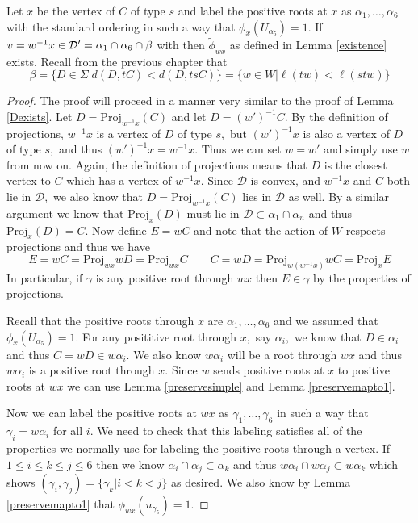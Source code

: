 \documentclass[class=book, crop=false]{standalone}
\begin{document}
\begin{lemma} 
	Let $x$ be the vertex of $C$ of type $s$ and label the positive roots at $x$ as $\alpha_1,\dots,\alpha_6$ with the standard ordering in such a way that $\phi_x(U_{\alpha_5})=1.$ If $v=w^{-1}x\in \mathcal{D}'=\alpha_1\cap \alpha_6\cap \beta$ with then $\tilde{\phi}_{wx}$ as defined in Lemma \ref{existence} exists. Recall from the previous chapter that 
	\[
	\beta=\{D\in \Sigma|d(D,tC)<d(D,tsC)\}=\{w\in W|\ell(tw)<\ell(stw)\}
\]
	\label{336f2Dexists}
\end{lemma}
\begin{proof}
	The proof will proceed in a manner very similar to the proof of Lemma \ref{Dexists}. Let $D=\mathrm{Proj}_{w^{-1}x}(C)$ and let $D=(w')^{-1}C.$ By the definition of projections, $w^{-1}x$ is a vertex of $D$ of type $s,$ but $(w')^{-1}x$ is also a vertex of $D$ of type $s,$ and thus $(w')^{-1}x=w^{-1}x.$ Thus we can set $w=w'$ and simply use $w$ from now on. Again, the definition of projections means that $D$ is the closest vertex to $C$ which has a vertex of $w^{-1}x.$ Since $\mathcal{D}$ is convex, and $w^{-1}x$ and $C$ both lie in $\mathcal{D},$ we also know that $D=\mathrm{Proj}_{w^{-1}x}(C)$ lies in $\mathcal{D}$ as well. By a similar argument we know that $\mathrm{Proj}_{x}(D)$ must lie in $\mathcal{D}\subset \alpha_1\cap \alpha_n$ and thus $\mathrm{Proj}_{x}(D)=C.$ Now define $E=wC$ and note that the action of $W$ respects projections and thus we have
	\[
		E=wC=\mathrm{Proj}_{wx}{wD}=\mathrm{Proj}_{wx}{C} \qquad C=wD=\mathrm{Proj}_{w(w^{-1}x)}{wC}=\mathrm{Proj}_{x}{E}
	\]
In particular, if $\gamma$ is any positive root through $wx$ then $E\in \gamma$ by the properties of projections.

Recall that the positive roots through $x$ are $\alpha_1,\dots,\alpha_6$ and we assumed that $\phi_x(U_{\alpha_5})=1.$ For any posititive root through $x,$ say $\alpha_i,$ we know that $D\in \alpha_i$ and thus $C=wD\in w\alpha_i.$ We also know $w\alpha_i$ will be a root through $wx$ and thus $w\alpha_i$ is a positive root through $x.$ Since $w$ sends positive roots at $x$ to positive roots at $wx$ we can use Lemma \ref{preservesimple} and Lemma \ref{preservemapto1}.

Now we can label the positive roots at $wx$ as $\gamma_1,\dots,\gamma_6$ in such a way that $\gamma_i=w\alpha_i$ for all $i.$ We need to check that this labeling satisfies all of the properties we normally use for labeling the positive roots through a vertex. If $1\le i\le k\le j\le 6$ then we know $\alpha_i\cap \alpha_j\subset \alpha_k$ and thus $w\alpha_i\cap w\alpha_j\subset w\alpha_k$ which shows $(\gamma_i,\gamma_j)=\{\gamma_k|i<k<j\}$ as desired. We also know by Lemma \ref{preservemapto1} that $\phi_{wx}(u_{\gamma_5})=1.$ 


\end{proof}
\end{document}

